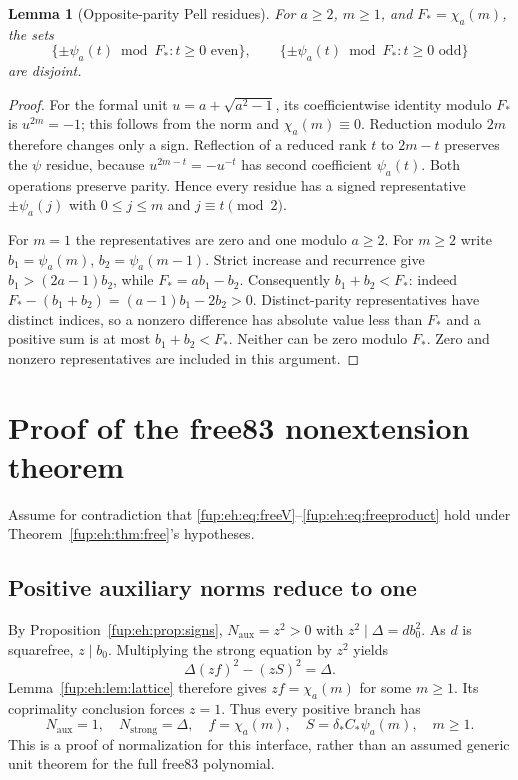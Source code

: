 \documentclass[11pt,letterpaper]{article}
\newtheorem{lemma}[theorem]{Lemma}
\theoremstyle{definition}\newtheorem{definition}[theorem]{Definition}
\theoremstyle{remark}\newtheorem{remark}[theorem]{Remark}
\newcommand{\D}{\Delta}
\newcommand{\Na}{N_{\mathrm{aux}}}\newcommand{\Nk}{N_{\mathrm{index}}}\newcommand{\Nt}{N_{\mathrm{transport}}}
\newcommand{\Ns}{N_{\mathrm{strong}}}
\begin{document}
\begin{lemma}[Opposite-parity Pell residues]\label{fup:eh:lem:parity}
For $a\ge2$, $m\ge1$, and $F_* =\chi_a(m)$, the sets
\[
 \{\pm\psi_a(t)\bmod F_*:t\ge0\text{ even}\},\qquad
 \{\pm\psi_a(t)\bmod F_*:t\ge0\text{ odd}\}
\]
are disjoint.
\end{lemma}
\begin{proof}
For the formal unit $u=a+\sqrt{a^2-1}$, its coefficientwise
identity modulo $F_*$ is $u^{2m}=-1$; this follows from the
norm and $\chi_a(m)\equiv0$. Reduction modulo $2m$ therefore
changes only a sign. Reflection of a reduced rank $t$ to $2m-t$
preserves the $\psi$ residue, because
$u^{2m-t}=-u^{-t}$ has second coefficient $\psi_a(t)$.
Both operations preserve parity. Hence every residue has a signed
representative $\pm\psi_a(j)$ with $0\le j\le m$ and
$j\equiv t\pmod2$.

For $m=1$ the representatives are zero and one modulo $a\ge2$.
For $m\ge2$ write $b_1=\psi_a(m)$, $b_2=\psi_a(m-1)$.
Strict increase and recurrence give $b_1>(2a-1)b_2$, while
$F_*=ab_1-b_2$. Consequently $b_1+b_2<F_*$:
indeed $F_*-(b_1+b_2)=(a-1)b_1-2b_2>0$.
Distinct-parity representatives have distinct indices, so a nonzero
difference has absolute value less than $F_*$ and a positive sum is
at most $b_1+b_2<F_*$. Neither can be zero modulo $F_*$.
Zero and nonzero representatives are included in this argument.
\end{proof}

\section{Proof of the free83 nonextension theorem}
\label{fup:eh:sec:freeproof}
Assume for contradiction that \eqref{fup:eh:eq:freeV}--\eqref{fup:eh:eq:freeproduct}
hold under Theorem~\ref{fup:eh:thm:free}'s hypotheses.

\subsection{Positive auxiliary norms reduce to one}
By Proposition~\ref{fup:eh:prop:signs}, $\Na=z^2>0$ with
$z^2\mid\D=d b_0^2$. As $d$ is squarefree, $z\mid b_0$.
Multiplying the strong equation by $z^2$ yields
\[
 \D(zf)^2-(zS)^2=\D.
\]
Lemma~\ref{fup:eh:lem:lattice} therefore gives $zf=\chi_a(m)$ for
some $m\ge1$. Its coprimality conclusion forces $z=1$.
Thus every positive branch has
\begin{equation}\label{fup:eh:eq:unitbranch}
 \Na=1,\quad \Ns=\D,\quad
 f=\chi_a(m),\quad S=\delta_*C_*\psi_a(m),\quad m\ge1.
\end{equation}
This is a proof of normalization for this interface, rather than an
assumed generic unit theorem for the full free83 polynomial.
\end{document}
